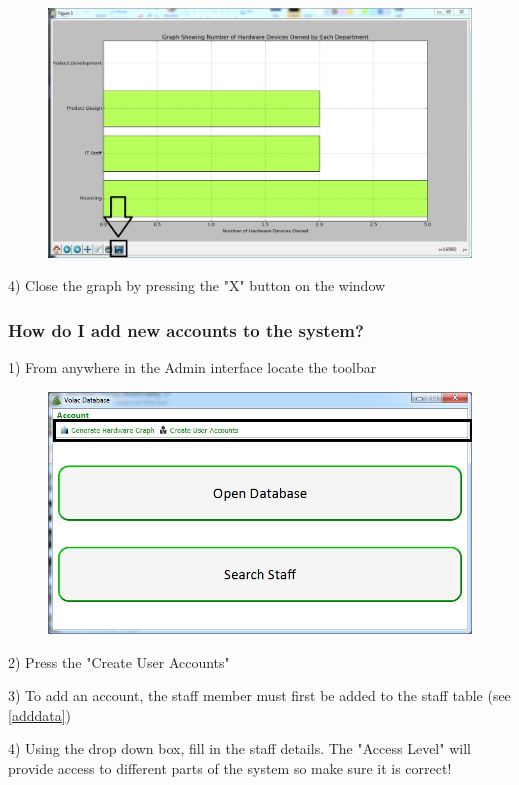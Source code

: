 \begin{figure}[H]
    \includegraphics[width=\textwidth]{./Manual/Images/graph2.png}
\end{figure}

4) Close the graph by pressing the "X" button on the window

\subsubsection{How do I add new accounts to the system?}

1) From anywhere in the Admin interface locate the toolbar

\begin{figure}[H]
    \includegraphics[width=\textwidth]{./Manual/Images/graph1.png}
\end{figure}

2) Press the "Create User Accounts"

3) To add an account, the staff member must first be added to the staff table (see \ref{adddata})

4) Using the drop down box, fill in the staff details. The "Access Level" will provide access to different parts of the system so make sure it is correct! 

